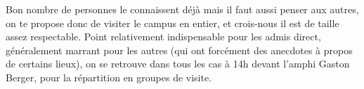 Bon nombre de personnes le connaissent déjà mais il faut aussi penser aux
autres, on te propose donc de visiter le campus en entier, et crois-nous il est
de taille assez respectable. Point relativement indispensable pour les admis direct,
généralement marrant pour les autres (qui ont forcément des anecdotes à
propos de certains lieux), on se retrouve dans tous les cas à 14h
devant l'amphi Gaston Berger, pour la répartition en groupes de visite.

